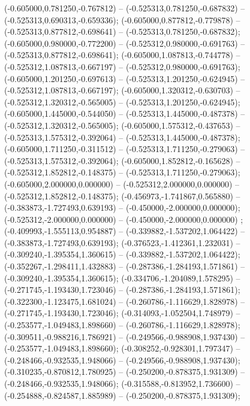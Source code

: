  (-0.605000,0.781250,-0.767812) -- (-0.525313,0.781250,-0.687832) -- (-0.525313,0.690313,-0.659336);
 (-0.605000,0.877812,-0.779878) -- (-0.525313,0.877812,-0.698641) -- (-0.525313,0.781250,-0.687832);
 (-0.605000,0.980000,-0.772200) -- (-0.525312,0.980000,-0.691763) -- (-0.525313,0.877812,-0.698641);
 (-0.605000,1.087813,-0.744778) -- (-0.525312,1.087813,-0.667197) -- (-0.525312,0.980000,-0.691763);
 (-0.605000,1.201250,-0.697613) -- (-0.525313,1.201250,-0.624945) -- (-0.525312,1.087813,-0.667197);
 (-0.605000,1.320312,-0.630703) -- (-0.525312,1.320312,-0.565005) -- (-0.525313,1.201250,-0.624945);
 (-0.605000,1.445000,-0.544050) -- (-0.525313,1.445000,-0.487378) -- (-0.525312,1.320312,-0.565005);
 (-0.605000,1.575312,-0.437653) -- (-0.525313,1.575312,-0.392064) -- (-0.525313,1.445000,-0.487378);
 (-0.605000,1.711250,-0.311512) -- (-0.525313,1.711250,-0.279063) -- (-0.525313,1.575312,-0.392064);
 (-0.605000,1.852812,-0.165628) -- (-0.525312,1.852812,-0.148375) -- (-0.525313,1.711250,-0.279063);
 (-0.605000,2.000000,0.000000) -- (-0.525312,2.000000,0.000000) -- (-0.525312,1.852812,-0.148375);
 (-0.456973,-1.741867,0.565880) -- (-0.383873,-1.727493,0.639193) -- (-0.450000,-2.000000,0.000000);
 (-0.525312,-2.000000,0.000000) -- (-0.450000,-2.000000,0.000000) ;
 (-0.409993,-1.555113,0.954887) -- (-0.339882,-1.537202,1.064422) -- (-0.383873,-1.727493,0.639193);
 (-0.376523,-1.412361,1.232031) -- (-0.309240,-1.395354,1.360615) -- (-0.339882,-1.537202,1.064422);
 (-0.352267,-1.298411,1.432883) -- (-0.287386,-1.284193,1.571861) -- (-0.309240,-1.395354,1.360615);
 (-0.334706,-1.204089,1.578295) -- (-0.271745,-1.193430,1.723046) -- (-0.287386,-1.284193,1.571861);
 (-0.322300,-1.123475,1.681024) -- (-0.260786,-1.116629,1.828978) -- (-0.271745,-1.193430,1.723046);
 (-0.314093,-1.052504,1.748979) -- (-0.253577,-1.049483,1.898660) -- (-0.260786,-1.116629,1.828978);
 (-0.309511,-0.988216,1.786921) -- (-0.249566,-0.988908,1.937430) -- (-0.253577,-1.049483,1.898660);
 (-0.308252,-0.928301,1.797347) -- (-0.248466,-0.932535,1.948066) -- (-0.249566,-0.988908,1.937430);
 (-0.310235,-0.870812,1.780925) -- (-0.250200,-0.878375,1.931309) -- (-0.248466,-0.932535,1.948066);
 (-0.315588,-0.813952,1.736600) -- (-0.254888,-0.824587,1.885989) -- (-0.250200,-0.878375,1.931309);
